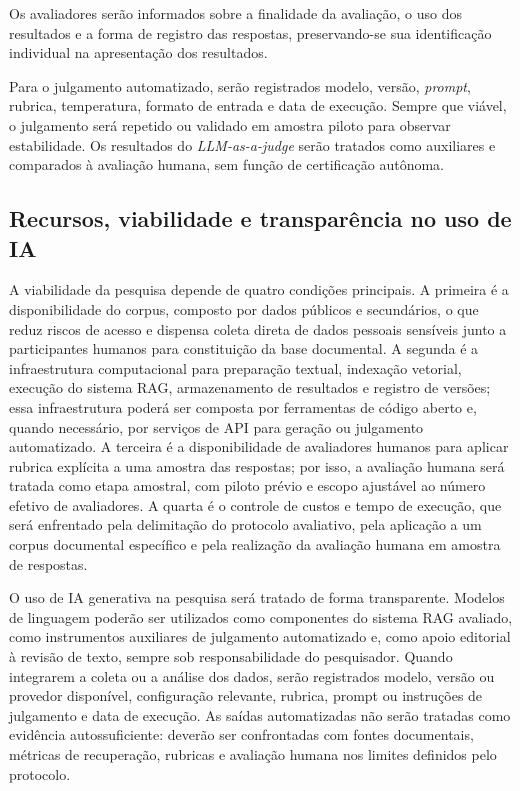 Os avaliadores serão informados sobre a finalidade da avaliação, o uso dos resultados e a forma de registro das respostas, preservando-se sua identificação individual na apresentação dos resultados.

Para o julgamento automatizado, serão registrados modelo, versão, \textit{prompt}, rubrica, temperatura, formato de entrada e data de execução. Sempre que viável, o julgamento será repetido ou validado em amostra piloto para observar estabilidade. Os resultados do \textit{LLM-as-a-judge} serão tratados como auxiliares e comparados à avaliação humana, sem função de certificação autônoma.

\subsection{Recursos, viabilidade e transparência no uso de IA}

A viabilidade da pesquisa depende de quatro condições principais. A primeira é a disponibilidade do corpus, composto por dados públicos e secundários, o que reduz riscos de acesso e dispensa coleta direta de dados pessoais sensíveis junto a participantes humanos para constituição da base documental. A segunda é a infraestrutura computacional para preparação textual, indexação vetorial, execução do sistema RAG, armazenamento de resultados e registro de versões; essa infraestrutura poderá ser composta por ferramentas de código aberto e, quando necessário, por serviços de API para geração ou julgamento automatizado. A terceira é a disponibilidade de avaliadores humanos para aplicar rubrica explícita a uma amostra das respostas; por isso, a avaliação humana será tratada como etapa amostral, com piloto prévio e escopo ajustável ao número efetivo de avaliadores. A quarta é o controle de custos e tempo de execução, que será enfrentado pela delimitação do protocolo avaliativo, pela aplicação a um corpus documental específico e pela realização da avaliação humana em amostra de respostas.

O uso de IA generativa na pesquisa será tratado de forma transparente. Modelos de linguagem poderão ser utilizados como componentes do sistema RAG avaliado, como instrumentos auxiliares de julgamento automatizado e, como apoio editorial à revisão de texto, sempre sob responsabilidade do pesquisador. Quando integrarem a coleta ou a análise dos dados, serão registrados modelo, versão ou provedor disponível, configuração relevante, rubrica, prompt ou instruções de julgamento e data de execução. As saídas automatizadas não serão tratadas como evidência autossuficiente: deverão ser confrontadas com fontes documentais, métricas de recuperação, rubricas e avaliação humana nos limites definidos pelo protocolo.

